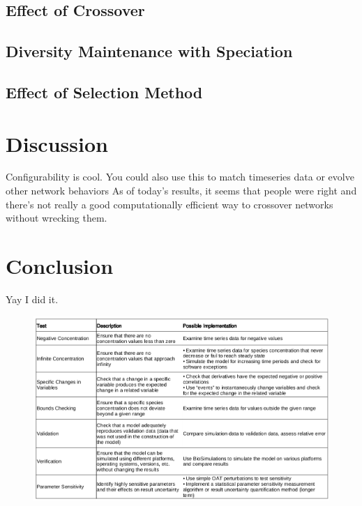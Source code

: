 \documentclass[12pt]{report}
\begin{document}
\subsection{Effect of Crossover}
\subsection{Diversity Maintenance with Speciation}
\subsection{Effect of Selection Method}

\section{Discussion}
Configurability is cool. 
You could also use this to match timeseries data or evolve other network behaviors
As of today's results, it seems that people were right and there's not really a good computationally efficient way to crossover networks without wrecking them.

\section{Conclusion}
Yay I did it.

	


\begin{figure}
    \centering
    \includegraphics[width=19cm]{images/testSummary.png}
    \label{table:sensitivity}
\end{figure}





\end{document}
